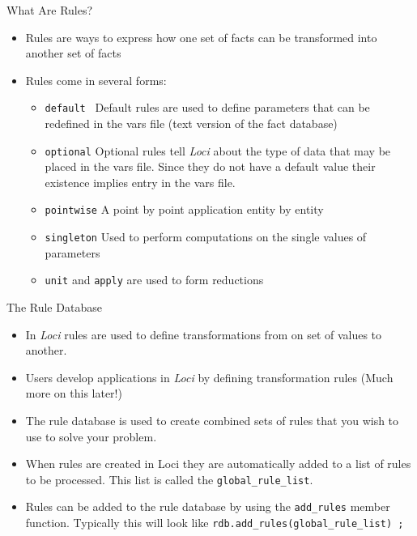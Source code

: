 \documentclass{beamer}
\begin{document}
\begin{frame}{What Are Rules?}
\begin{itemize}
  \item Rules are ways to express how one set of facts can be transformed into another set of facts
  \item Rules come in several forms:
\begin{itemize}
\item {\tt default } Default rules are used to define parameters that can be redefined in the vars file (text version of the fact database)
\item {\tt optional} Optional rules tell {\it Loci} about the type of data that may be placed in the vars file.  Since they do not have a default value their existence implies entry in the vars file.
\item {\tt pointwise} A point by point application entity by entity
\item {\tt singleton} Used to perform computations on the single values of parameters
\item {\tt unit} and {\tt apply} are used to form reductions
\end{itemize}
\end{itemize}
\end{frame}
\begin{frame}{The Rule Database}
\begin{itemize}
\item In {\it Loci} rules are used to define transformations from on set of values to another.
\item Users develop applications in {\it Loci} by defining transformation rules (Much more on this later!)
\item The rule database is used to create combined sets of rules that you wish to use to solve your problem.
\item When rules are created in Loci they are automatically added to a list of rules to be processed.  This list is called the {\tt global\_rule\_list}.
\item Rules can be added to the rule database by using the {\tt add\_rules} member function.  Typically this will look like {\tt rdb.add\_rules(global\_rule\_list) ; }
\end{itemize}
\end{frame}
\end{document}
